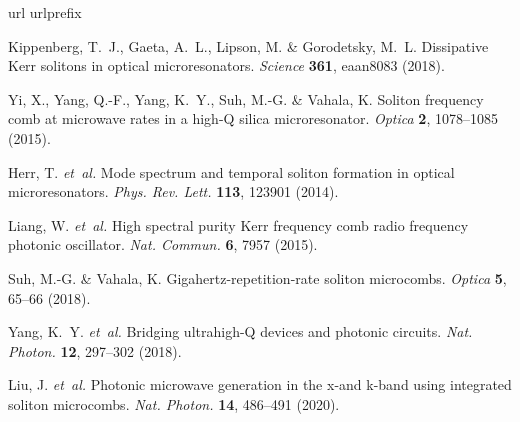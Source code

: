 \documentclass[noshowpacs,amsmath,
twocolumn,
superscriptaddress,
8pt,
aps,prb]{revtex4-2}
\begin{document}
\begin{thebibliography}{10}
\expandafter\ifx\csname url\endcsname\relax
  \def\url#1{\texttt{#1}}\fi
\expandafter\ifx\csname urlprefix\endcsname\relax\def\urlprefix{URL }\fi
\providecommand{\bibinfo}[2]{#2}
\providecommand{\eprint}[2][]{\url{#2}}

\bibinfo{author}{Kippenberg, T.~J.}, \bibinfo{author}{Gaeta, A.~L.},
  \bibinfo{author}{Lipson, M.} \& \bibinfo{author}{Gorodetsky, M.~L.}
\newblock \bibinfo{title}{Dissipative {K}err solitons in optical
  microresonators}.
\newblock \emph{\bibinfo{journal}{Science}} \textbf{\bibinfo{volume}{361}}, \bibinfo{pages}{eaan8083}
  (\bibinfo{year}{2018}).

\bibinfo{author}{Yi, X.}, \bibinfo{author}{Yang, Q.-F.}, \bibinfo{author}{Yang,
  K.~Y.}, \bibinfo{author}{Suh, M.-G.} \& \bibinfo{author}{Vahala, K.}
\newblock \bibinfo{title}{Soliton frequency comb at microwave rates in a
  high-{Q} silica microresonator}.
\newblock \emph{\bibinfo{journal}{Optica}} \textbf{\bibinfo{volume}{2}},
  \bibinfo{pages}{1078--1085} (\bibinfo{year}{2015}).

\bibinfo{author}{Herr, T.} \emph{et~al.}
\newblock \bibinfo{title}{Mode spectrum and temporal soliton formation in
  optical microresonators}.
\newblock \emph{\bibinfo{journal}{Phys. Rev. Lett.}}
  \textbf{\bibinfo{volume}{113}}, \bibinfo{pages}{123901}
  (\bibinfo{year}{2014}).

\bibinfo{author}{Liang, W.} \emph{et~al.}
\newblock \bibinfo{title}{High spectral purity {Kerr} frequency comb radio
  frequency photonic oscillator}.
\newblock \emph{\bibinfo{journal}{Nat. Commun.}} \textbf{\bibinfo{volume}{6}},
  \bibinfo{pages}{7957} (\bibinfo{year}{2015}).

\bibinfo{author}{Suh, M.-G.} \& \bibinfo{author}{Vahala, K.}
\newblock \bibinfo{title}{Gigahertz-repetition-rate soliton microcombs}.
\newblock \emph{\bibinfo{journal}{Optica}} \textbf{\bibinfo{volume}{5}},
  \bibinfo{pages}{65--66} (\bibinfo{year}{2018}).

\bibinfo{author}{Yang, K.~Y.} \emph{et~al.}
\newblock \bibinfo{title}{Bridging ultrahigh-{Q} devices and photonic
  circuits}.
\newblock \emph{\bibinfo{journal}{Nat. Photon.}} \textbf{\bibinfo{volume}{12}},
  \bibinfo{pages}{297--302} (\bibinfo{year}{2018}).

\bibinfo{author}{Liu, J.} \emph{et~al.}
\newblock \bibinfo{title}{Photonic microwave generation in the x-and k-band
  using integrated soliton microcombs}.
\newblock \emph{\bibinfo{journal}{Nat. Photon.}} \textbf{\bibinfo{volume}{14}},
  \bibinfo{pages}{486--491}
  (\bibinfo{year}{2020}).


\end{thebibliography}
\end{document}
